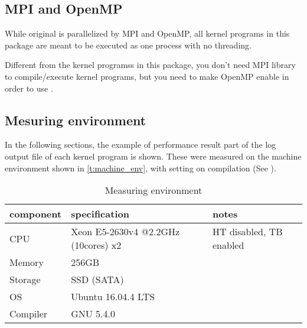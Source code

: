 \subsection{MPI and OpenMP}

While original \DYNAMICO is parallelized by MPI and OpenMP, all kernel
programs in this package are meant to be executed as one process with
no threading.

Different from the \NICAM kernel programss in this package, you don't
need MPI library to compile/execute \DYNAMICO kernel programs, but you
need to make OpenMP enable in order to use .

\subsection{Mesuring environment}\label{s:measuring_env}

In the following sections, the example of performance result part of the
log output file of each kernel program is shown.
%
These were measured on the machine environment shown in
\autoref{t:machine_env},
with setting  on compilation
(See ).


\begin{table}[htbp]
\centering
\caption{Measuring environment}\label{t:machine_env}
\small
\begin{tabularx}{.8\textwidth}{llX}
\hline
component & specification & notes \\
\hline
 CPU & Xeon E5-2630v4 @2.2GHz (10cores) x2 & HT disabled, TB enabled\\
 Memory & 256GB &\\
 Storage & SSD (SATA) &\\
 OS & Ubuntu 16.04.4 LTS &\\
 Compiler & GNU 5.4.0 & \\
\hline
\end{tabularx}
\end{table}



